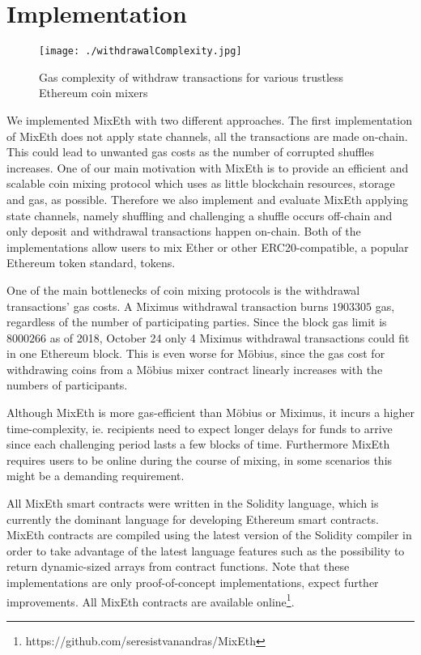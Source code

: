 \documentclass[a4paper]{article}
\theoremstyle{definition}
\begin{document}
\section{Implementation}

\begin{wrapfigure}{r}{0.7\textwidth}
	\centering
	\texttt{[image: ./withdrawalComplexity.jpg]}
	\captionsetup{justification=centering}
	\caption{Gas complexity of withdraw transactions for various trustless Ethereum coin mixers}
\end{wrapfigure} 

We implemented MixEth with two different approaches. The first implementation of MixEth does not apply state channels, all the transactions are made on-chain. This could lead to unwanted gas costs as the number of corrupted shuffles increases. One of our main motivation with MixEth is to provide an efficient and scalable coin mixing protocol which uses as little blockchain resources, storage and gas, as possible. Therefore we also implement and evaluate MixEth applying state channels, namely shuffling and challenging a shuffle occurs off-chain and only deposit and withdrawal transactions happen on-chain.
Both of the implementations allow users to mix Ether or other ERC20-compatible, a popular Ethereum token standard, tokens.

One of the main bottlenecks of coin mixing protocols is the withdrawal transactions' gas costs. A Miximus withdrawal transaction burns $\num[group-separator={,}]{1903305}$ gas, regardless of the number of participating parties. Since the block gas limit is $\num[group-separator={,}]{8000266}$ as of 2018, October 24 only 4 Miximus withdrawal transactions could fit in one Ethereum block. This is even worse for Möbius, since the gas cost for withdrawing coins from a Möbius mixer contract linearly increases with the numbers of participants.

Although MixEth is more gas-efficient than Möbius or Miximus, it incurs a higher time-complexity, ie. recipients need to expect longer delays for funds to arrive since each challenging period lasts a few blocks of time. Furthermore MixEth requires users to be online during the course of mixing, in some scenarios this might be a demanding requirement.

All MixEth smart contracts were written in the Solidity language, which is currently the dominant language for developing Ethereum smart contracts. MixEth contracts are compiled using the latest version of the Solidity compiler in order to take advantage of the latest language features such as the possibility to return dynamic-sized arrays from contract functions. Note that these implementations are only proof-of-concept implementations, expect further improvements. All MixEth contracts are available online\footnote{https://github.com/seresistvanandras/MixEth}.  
\end{document}
